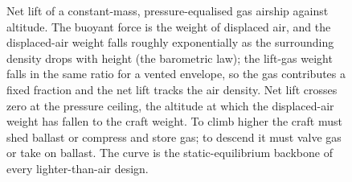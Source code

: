 \begin{figure}[htbp]
\centering
{}
\caption[Net lift of an airship against altitude]{Net lift of a
constant-mass, pressure-equalised gas airship against altitude. The buoyant
force is the weight of displaced air, and the displaced-air weight falls
roughly exponentially as the surrounding density drops with height (the
barometric law); the lift-gas weight falls in the same ratio for a vented
envelope, so the gas contributes a fixed fraction and the net lift tracks the
air density. Net lift crosses zero at the pressure ceiling, the altitude at
which the displaced-air weight has fallen to the craft weight. To climb
higher the craft must shed ballast or compress and store gas; to descend it
must valve gas or take on ballast. The curve is the static-equilibrium
backbone of every lighter-than-air design.}
\label{fig:vol03ch10:airship-equilibrium}
\end{figure}
